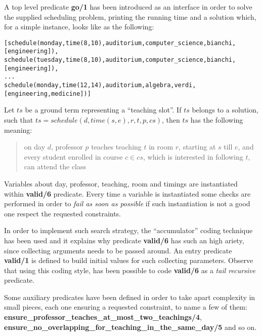 \documentclass[10pt,a4paper]{article} %
\begin{document}
    A top level predicate \textbf{go/1} has been introduced as an interface in order
    to solve the supplied scheduling problem, printing the running time and a
    solution which, for a simple instance, looks like as the following:
    \begin{verbatim}
[schedule(monday,time(8,10),auditorium,computer_science,bianchi,[engineering]),
schedule(tuesday,time(8,10),auditorium,computer_science,bianchi,[engineering]),
...
schedule(monday,time(12,14),auditorium,algebra,verdi,[engineering,medicine])]
    \end{verbatim}
    Let $ts$ be a ground term representing a ``teaching slot''. If $ts$ belongs to a
    solution, such that $ts = schedule(d, time(s,e), r, t, p, cs)$,
    then $ts$ has the following meaning:
    \begin{quote}
        on day $d$, professor $p$ teaches teaching $t$ in room $r$,
        starting at $s$ till $e$, and every student enrolled in course $c \in cs$,
        which is interested in following $t$, can attend the class
    \end{quote}

    Variables about day, professor, teaching, room and timings
    are instantiated within \textbf{valid/6} predicate.
    Every time a variable is instantiated some
    checks are performed in order to \emph{fail as soon as possible} if such
    instantiation is not a good one respect the requested constraints.

    In order to implement such search strategy, the ``accumulator''
    coding technique has been used and it explains why predicate \textbf{valid/6} has
    such an high ariety, since collecting arguments needs to be passed around.
    An entry predicate \textbf{valid/1} is defined to build
    initial values for such collecting parameters.
    Observe that using this coding style, has been
    possible to code \textbf{valid/6} as a \emph{tail recursive} predicate.

    Some auxiliary predicates have been defined in order to take apart
    complexity in small pieces, each one ensuring a requested constraint,
    to name a few of them: \textbf{ensure\_professor\_teaches\_at\_most\_two\_teachings/4},
    \textbf{ensure\_no\_overlapping\_for\_teaching\_in\_the\_same\_day/5} and so on.
\end{document}
